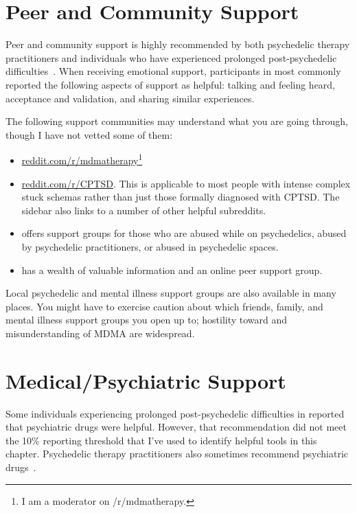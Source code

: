 \documentclass[11pt,oneside]{book}
\let\cite\parencite
\begin{document}
\section{Peer and Community Support}
Peer and community support is highly recommended by both psychedelic therapy practitioners and individuals who have experienced prolonged post-psychedelic difficulties~\cite{argyri2025practitioner,robinson2024coming}. When receiving emotional support, participants in \textcite{robinson2024coming} most commonly reported the following aspects of support as helpful: talking and feeling heard, acceptance and validation, and sharing similar experiences.

The following support communities may understand what you are going through, though I have not vetted some of them:
\begin{itemize}
    \item \href{https://www.reddit.com/r/mdmatherapy/}{reddit.com/r/mdmatherapy}\footnote{I am a moderator on /r/mdmatherapy.}
    \item \href{https://www.reddit.com/r/CPTSD/}{reddit.com/r/CPTSD}. This is applicable to most people with intense complex stuck schemas rather than just those formally diagnosed with CPTSD. The sidebar also links to a number of other helpful subreddits.
    \item \textcite{shineCollective} offers support groups for those who are abused while on psychedelics, abused by psychedelic practitioners, or abused in psychedelic spaces.
    \item \textcite{peersupportgroup} has a wealth of valuable information and an online peer support group.
\end{itemize}

Local psychedelic and mental illness support groups are also available in many places. You might have to exercise caution about which friends, family, and mental illness support groups you open up to; hostility toward and misunderstanding of MDMA are widespread.

\section{Medical/Psychiatric Support}
\label{medicalSupport}
Some individuals experiencing prolonged post-psychedelic difficulties in \textcite{robinson2024coming} reported that psychiatric drugs were helpful. However, that recommendation did not meet the 10\% reporting threshold that I've used to identify helpful tools in this chapter. Psychedelic therapy practitioners also sometimes recommend psychiatric drugs~\cite{argyri2025practitioner}.
\end{document}
